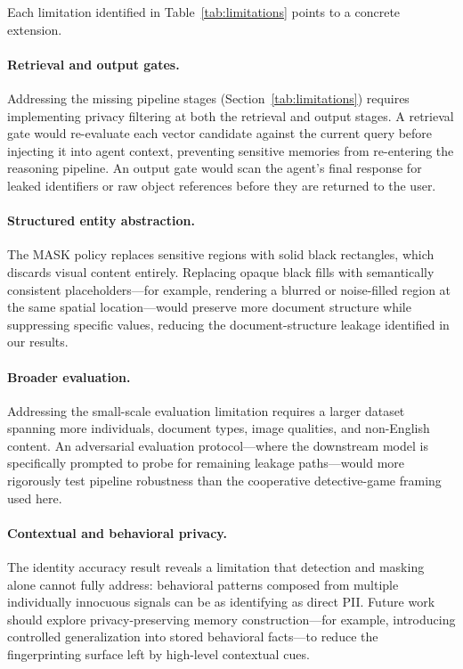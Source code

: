\documentclass[11pt]{article}
\begin{document}
Each limitation identified in Table~\ref{tab:limitations} points to a concrete extension.

\paragraph{Retrieval and output gates.} Addressing the missing pipeline stages (Section~\ref{tab:limitations}) requires implementing privacy filtering at both the retrieval and output stages. A retrieval gate would re-evaluate each vector candidate against the current query before injecting it into agent context, preventing sensitive memories from re-entering the reasoning pipeline. An output gate would scan the agent's final response for leaked identifiers or raw object references before they are returned to the user.

\paragraph{Structured entity abstraction.} The MASK policy replaces sensitive regions with solid black rectangles, which discards visual content entirely. Replacing opaque black fills with semantically consistent placeholders---for example, rendering a blurred or noise-filled region at the same spatial location---would preserve more document structure while suppressing specific values, reducing the document-structure leakage identified in our results.

\paragraph{Broader evaluation.} Addressing the small-scale evaluation limitation requires a larger dataset spanning more individuals, document types, image qualities, and non-English content. An adversarial evaluation protocol---where the downstream model is specifically prompted to probe for remaining leakage paths---would more rigorously test pipeline robustness than the cooperative detective-game framing used here.

\paragraph{Contextual and behavioral privacy.} The identity accuracy result reveals a limitation that detection and masking alone cannot fully address: behavioral patterns composed from multiple individually innocuous signals can be as identifying as direct PII. Future work should explore privacy-preserving memory construction---for example, introducing controlled generalization into stored behavioral facts---to reduce the fingerprinting surface left by high-level contextual cues.
\end{document}
